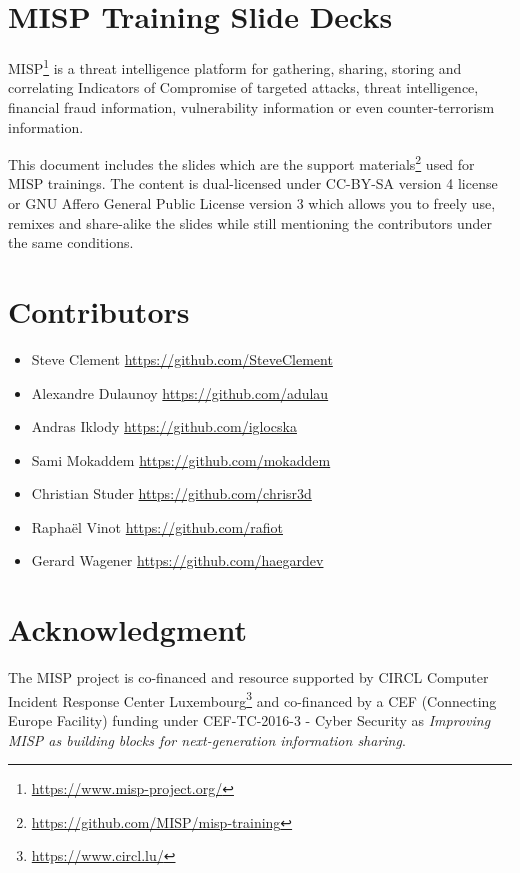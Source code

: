 \documentclass{article}
\begin{document}
\section{MISP Training Slide Decks}

MISP\footnote{\url{https://www.misp-project.org/}} is a threat intelligence platform for gathering, sharing, storing and correlating Indicators of Compromise of targeted attacks, threat intelligence, financial fraud information, vulnerability information or even counter-terrorism information.

This document includes the slides which are the support materials\footnote{\url{https://github.com/MISP/misp-training}} used for MISP trainings. The content is dual-licensed under CC-BY-SA version 4 license or GNU Affero General Public License version 3 which allows you to freely use, remixes and share-alike the slides while still mentioning the contributors under the same conditions.

\section{Contributors}

\begin{itemize}
\item Steve Clement \url{https://github.com/SteveClement}
\item Alexandre Dulaunoy \url{https://github.com/adulau}
\item Andras Iklody \url{https://github.com/iglocska}
\item Sami Mokaddem \url{https://github.com/mokaddem}
\item Christian Studer  \url{https://github.com/chrisr3d}
\item Raphaël Vinot \url{https://github.com/rafiot}
\item Gerard Wagener \url{https://github.com/haegardev}
\end{itemize}

\section{Acknowledgment}

The MISP project is co-financed and resource supported by CIRCL Computer Incident Response Center Luxembourg\footnote{\url{https://www.circl.lu/}} and co-financed by a CEF (Connecting Europe Facility) funding under CEF-TC-2016-3 - Cyber Security as {\it Improving MISP as building blocks for next-generation information sharing}.
\end{document}
